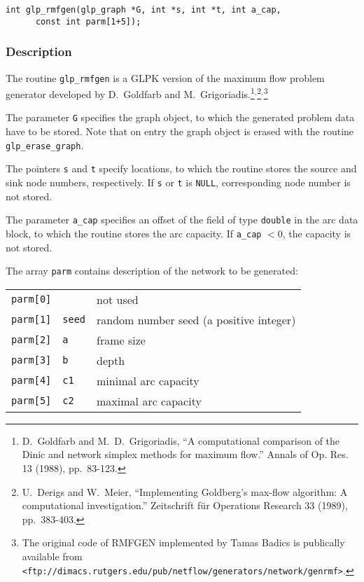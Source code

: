 \begin{verbatim}
int glp_rmfgen(glp_graph *G, int *s, int *t, int a_cap,
      const int parm[1+5]);
\end{verbatim}

\subsubsection*{Description}

The routine \verb|glp_rmfgen| is a GLPK version of the maximum flow
problem generator developed by D.~Goldfarb and
M.~Grigoriadis.\footnote{D.~Goldfarb and M.~D.~Grigoriadis,
``A computational comparison of the Dinic and network simplex methods
for maximum flow.'' Annals of Op. Res. 13 (1988),
pp.~83-123.}$^{,}$\footnote{U.~Derigs and W.~Meier, ``Implementing
Goldberg's max-flow algorithm: A computational investigation.''
Zeitschrift f\"ur Operations Research 33 (1989),
pp.~383-403.}$^{,}$\footnote{The original code of RMFGEN implemented by
Tamas Badics is publically available from
{\tt <ftp://dimacs.rutgers.edu/pub/netflow/generators/network/genrmf>}.}

The parameter \verb|G| specifies the graph object, to which the
generated problem data have to be stored. Note that on entry the graph
object is erased with the routine \verb|glp_erase_graph|.

The pointers \verb|s| and \verb|t| specify locations, to which the
routine stores the source and sink node numbers, respectively. If
\verb|s| or \verb|t| is \verb|NULL|, corresponding node number is not
stored.

The parameter \verb|a_cap| specifies an offset of the field of type
\verb|double| in the arc data block, to which the routine stores the arc
capacity. If \verb|a_cap| $<0$, the capacity is not stored.

The array \verb|parm| contains description of the network to be
generated:

\begin{tabular}{@{}lll@{}}
\verb|parm[0]|&           &not used\\
\verb|parm[1]|&\verb|seed|&random number seed (a positive integer)\\
\verb|parm[2]|&\verb|a   |&frame size\\
\verb|parm[3]|&\verb|b   |&depth\\
\verb|parm[4]|&\verb|c1  |&minimal arc capacity\\
\verb|parm[5]|&\verb|c2  |&maximal arc capacity\\
\end{tabular}

